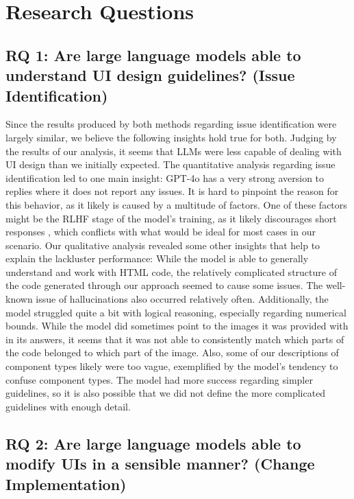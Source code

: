 \documentclass[11pt,titlepage,oneside,openany]{book}
\begin{document}
\section{Research Questions}\label{sec:rq}

\subsection{RQ 1: Are large language models able to understand UI design guidelines? (Issue Identification)}

Since the results produced by both methods regarding issue identification were largely similar, we believe the following insights hold true for both. Judging by the results of our analysis, it seems that LLMs were less capable of dealing with UI design than we initially expected. The quantitative analysis regarding issue identification led to one main insight: GPT-4o has a very strong aversion to replies where it does not report any issues. It is hard to pinpoint the reason for this behavior, as it likely is caused by a multitude of factors. One of these factors might be the RLHF stage of the model's training, as it likely discourages short responses \cite{singhal_long_2024}, which conflicts with what would be ideal for most cases in our scenario. Our qualitative analysis revealed some other insights that help to explain the lackluster performance: While the model is able to generally understand and work with HTML code, the relatively complicated structure of the code generated through our approach seemed to cause some issues. The well-known issue of hallucinations also occurred relatively often. Additionally, the model struggled quite a bit with logical reasoning, especially regarding numerical bounds. While the model did sometimes point to the images it was provided with in its answers, it seems that it was not able to consistently match which parts of the code belonged to which part of the image. Also, some of our descriptions of component types likely were too vague, exemplified by the model's tendency to confuse component types. The model had more success regarding simpler guidelines, so it is also possible that we did not define the more complicated guidelines with enough detail.

\subsection{RQ 2: Are large language models able to modify UIs in a sensible manner? (Change Implementation)}
\end{document}
